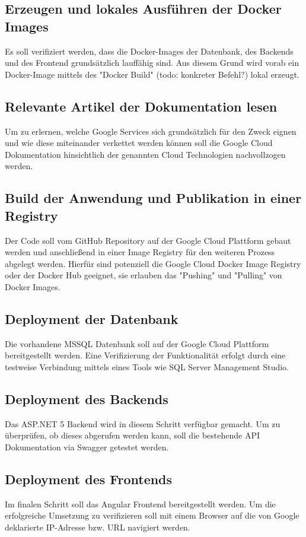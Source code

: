 \documentclass[pdftex,a4paper,abstracton,11pt,parskip=half,bibtotocnumbered]{scrartcl}
\begin{document}
	\subsection{Erzeugen und lokales Ausführen der Docker Images}
	Es soll verifiziert werden, dass die Docker-Images der Datenbank, des Backends und des Frontend grundsätzlich lauffähig sind. Aus diesem Grund wird 
	vorab ein Docker-Image mittels des "Docker Build" (todo: konkreter Befehl?) lokal erzeugt.

	\subsection{Relevante Artikel der Dokumentation lesen}
	Um zu erlernen, welche Google Services sich grundsätzlich für den Zweck eignen und wie diese miteinander verkettet werden können soll die Google
	Cloud Dokumentation hinsichtlich der genannten Cloud Technologien nachvollzogen werden.

	\subsection{Build der Anwendung und Publikation in einer Registry}
	Der Code soll vom GitHub Repository auf der Google Cloud Plattform gebaut werden und anschließend in einer Image Registry für den weiteren Prozess
	abgelegt werden. Hierfür sind potenziell die Google Cloud Docker Image Registry oder der Docker Hub geeignet, sie erlauben das "Pushing" und "Pulling"
	von Docker Images. 

	\subsection{Deployment der Datenbank}
	Die vorhandene MSSQL Datenbank soll auf der Google Cloud Plattform bereitgestellt werden. Eine Verifizierung der Funktionalität erfolgt durch 
	eine testweise Verbindung mittels eines Tools wie SQL Server Management Studio. 

	\subsection{Deployment des Backends}
	Das ASP.NET 5 Backend wird in diesem Schritt verfügbar gemacht. Um zu überprüfen, ob dieses abgerufen werden kann, soll die bestehende API 
	Dokumentation via Swagger getestet werden. 
	
	\subsection{Deployment des Frontends}
	Im finalen Schritt soll das Angular Frontend bereitgestellt werden. Um die erfolgreiche Umsetzung zu verifizieren soll mit einem Browser auf
	die von Google deklarierte IP-Adresse bzw. URL navigiert werden.
\end{document}
